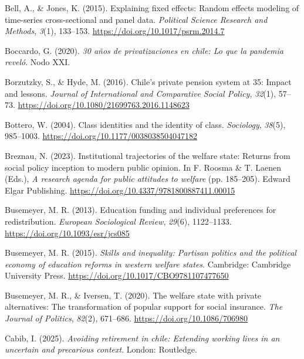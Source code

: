 \documentclass[
  12pt,
]{article}
\newlength{\cslhangindent}
\newenvironment{CSLReferences}[2] %
 {\begin{list}{}{%
  \setlength{\itemindent}{0pt}
  \setlength{\leftmargin}{0pt}
  \setlength{\parsep}{0pt}
  \ifodd #1
   \setlength{\leftmargin}{\cslhangindent}
   \setlength{\itemindent}{-1\cslhangindent}
  \fi
  \setlength{\itemsep}{#2\baselineskip}}}
 {\end{list}}
\begin{document}
\begin{CSLReferences}{1}{0}
Bell, A., \& Jones, K. (2015). Explaining fixed effects: Random effects
modeling of time-series cross-sectional and panel data. \emph{Political
Science Research and Methods}, \emph{3}(1), 133--153.
\url{https://doi.org/10.1017/psrm.2014.7}

Boccardo, G. (2020). \emph{30 años de privatizaciones en chile: Lo que
la pandemia reveló}. Nodo XXI.

Borzutzky, S., \& Hyde, M. (2016). Chile's private pension system at 35:
Impact and lessons. \emph{Journal of International and Comparative
Social Policy}, \emph{32}(1), 57--73.
\url{https://doi.org/10.1080/21699763.2016.1148623}

Bottero, W. (2004). Class identities and the identity of class.
\emph{Sociology}, \emph{38}(5), 985--1003.
\url{https://doi.org/10.1177/0038038504047182}

Breznau, N. (2023). Institutional trajectories of the welfare state:
Returns from social policy inception to modern public opinion. In F.
Roosma \& T. Laenen (Eds.), \emph{A research agenda for public attitudes
to welfare} (pp. 185--205). Edward Elgar Publishing.
\url{https://doi.org/10.4337/9781800887411.00015}

Busemeyer, M. R. (2013). Education funding and individual preferences
for redistribution. \emph{European Sociological Review}, \emph{29}(6),
1122--1133. \url{https://doi.org/10.1093/esr/jcs085}

Busemeyer, M. R. (2015). \emph{Skills and inequality: Partisan politics
and the political economy of education reforms in western welfare
states}. Cambridge: Cambridge University Press.
\url{https://doi.org/10.1017/CBO9781107477650}

Busemeyer, M. R., \& Iversen, T. (2020). The welfare state with private
alternatives: The transformation of popular support for social
insurance. \emph{The Journal of Politics}, \emph{82}(2), 671--686.
\url{https://doi.org/10.1086/706980}

Cabib, I. (2025). \emph{Avoiding retirement in chile: Extending working
lives in an uncertain and precarious context}. London: Routledge.


\end{CSLReferences}
\end{document}

